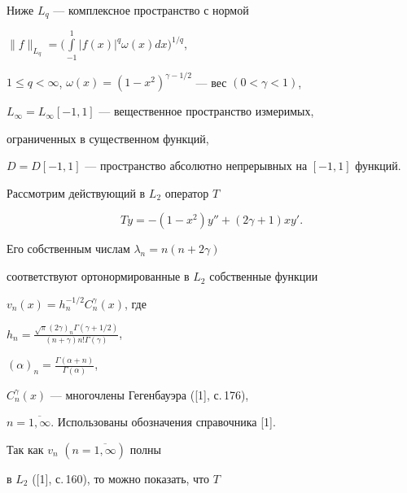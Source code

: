 \date{}




\pagestyle{plain} %







\maketitle


\label{begin}





Ниже $L_q$ --- комплексное пространство с нормой


$\|f\|_{L_q}=\Big(\int\limits_{-1}^1|f(x)|^q\omega(x)dx\Big)^{1/q}$,


$1\le q<\infty$, $\omega(x)=(1-x^2)^{\gamma-1/2}$ --- вес $(0<\gamma<1)$,


$L_\infty=L_\infty[-1,1]$ --- вещественное пространство измеримых,


ограниченных в существенном функций,


$D=D[-1,1]$ --- пространство абсолютно непрерывных на $[-1,1]$ функций.





Рассмотрим действующий в $L_2$ оператор $T$


$$


Ty=-(1-x^2)y''+(2\gamma+1)xy'.


$$


Его собственным числам $\lambda_n=n(n+2\gamma)$


соответствуют ортонормированные в $L_2$ собственные функции


$v_n(x)=h_n^{-1/2}C_n^\gamma(x)$, где


$h_n=\frac{\sqrt\pi (2\gamma)_n\Gamma(\gamma+1/2)}


{(n+\gamma)n!\Gamma(\gamma)}$,


$(\alpha)_n=\frac{\Gamma(\alpha+n)}{\Gamma(\alpha)}$,


$C_n^\gamma(x)$ --- многочлены Гегенбауэра ([1], с.\,176),


$n=\overline{1,\infty}$. Использованы обозначения справочника [1].


Так как $v_n$ $(n=\overline{1,\infty})$ полны


в $L_2$ ([1], с.\,160), то можно показать, что $T$


